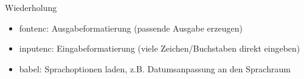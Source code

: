 

\begin{frame}{Wiederholung}
    \begin{itemize}[<+->]
        \item fontenc: Ausgabeformatierung (passende Ausgabe erzeugen)
        \item inputenc: Eingabeformatierung (viele Zeichen/Buchstaben direkt eingeben)
        \item babel: Sprachoptionen laden, z.B. Datumsanpassung an den Sprachraum
    \end{itemize}
\end{frame}